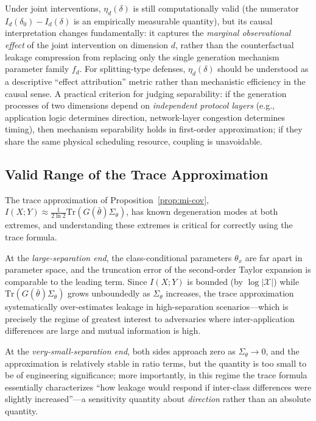 \documentclass[lettersize,journal]{IEEEtran}
\begin{document}
Under joint interventions, $\eta_d(\delta)$ is still computationally valid
(the numerator $I_d(\delta_0)-I_d(\delta)$ is an empirically measurable
quantity), but its causal interpretation changes fundamentally: it captures
the \emph{marginal observational effect} of the joint intervention on
dimension $d$, rather than the counterfactual leakage compression from
replacing only the single generation mechanism parameter family $f_d$.
For splitting-type defenses, $\eta_d(\delta)$ should be understood as a
descriptive ``effect attribution'' metric rather than mechanistic efficiency
in the causal sense.
A practical criterion for judging separability: if the generation processes
of two dimensions depend on \emph{independent protocol layers} (e.g.,
application logic determines direction, network-layer congestion determines
timing), then mechanism separability holds in first-order approximation;
if they share the same physical scheduling resource, coupling is unavoidable.

\subsection{Valid Range of the Trace Approximation}

The trace approximation of Proposition~\ref{prop:mi-cov},
$I(X;Y)\approx\frac{1}{2\ln 2}\mathrm{Tr}(G(\bar\theta)\Sigma_\theta)$,
has known degeneration modes at both extremes, and understanding these
extremes is critical for correctly using the trace formula.

At the \emph{large-separation end}, the class-conditional parameters
$\theta_x$ are far apart in parameter space, and the truncation error of
the second-order Taylor expansion is comparable to the leading term.
Since $I(X;Y)$ is bounded (by $\log|\mathcal{X}|$) while
$\mathrm{Tr}(G(\bar\theta)\Sigma_\theta)$ grows unboundedly as
$\Sigma_\theta$ increases, the trace approximation systematically
over-estimates leakage in high-separation scenarios---which is precisely
the regime of greatest interest to adversaries where inter-application
differences are large and mutual information is high.

At the \emph{very-small-separation end}, both sides approach zero as
$\Sigma_\theta\to 0$, and the approximation is relatively stable in ratio
terms, but the quantity is too small to be of engineering significance;
more importantly, in this regime the trace formula essentially characterizes
``how leakage would respond if inter-class differences were slightly
increased''---a sensitivity quantity about \emph{direction} rather than
an absolute quantity.
\end{document}
